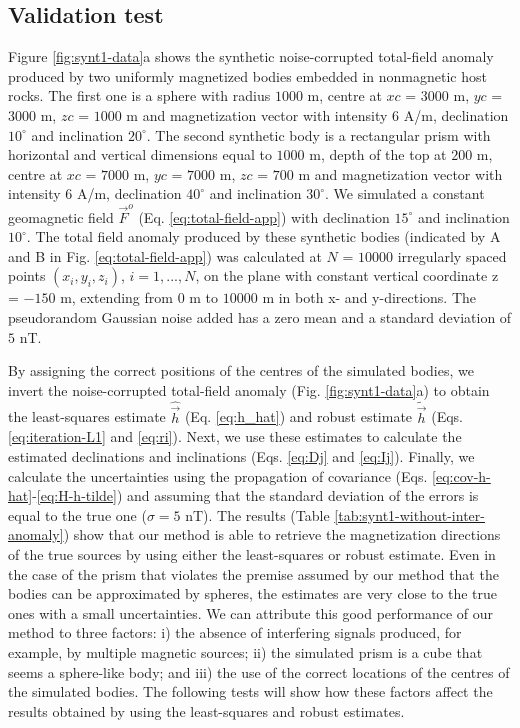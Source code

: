 \documentclass[journal abbreviation, npg]{copernicus}
\begin{document}
\subsection{Validation test}

Figure \ref{fig:synt1-data}a shows the synthetic noise-corrupted total-field anomaly produced by two uniformly magnetized bodies embedded in nonmagnetic host rocks. The first one is a sphere with radius $1000$ m, centre at $xc$ = $3000$ m, $yc$ = $3000$ m, $zc$ = $1000$ m and magnetization vector with intensity $6$ A/m, declination $10^{\circ}$ and inclination $20^{\circ}$. The second synthetic body is a rectangular prism with horizontal and vertical dimensions equal to $1000$ m, depth of the top at $200$ m, centre at $xc$ = $7000$ m, $yc$ = $7000$ m, $zc$ = $700$ m and magnetization vector with intensity $6$ A/m, declination $40^{\circ}$ and inclination $30^{\circ}$. We simulated a constant geomagnetic field $\vec{F}^{o}$ (Eq. \ref{eq:total-field-app}) with declination $15^{\circ}$ and inclination $10^{\circ}$. The total field anomaly produced by these synthetic bodies (indicated by A and B in Fig. \ref{eq:total-field-app}) was calculated at $N$ = $10000$ irregularly spaced points $(x_{i}, y_{i}, z_{i})$, $i = 1, ..., N$, on the plane with constant vertical coordinate z = $-150$ m, extending from $0$ m to $10000$ m in both x- and y-directions. The pseudorandom Gaussian noise added has a zero mean and a standard deviation of $5$ nT. 

By assigning the correct positions of the centres of the simulated bodies, we invert the noise-corrupted total-field anomaly (Fig. \ref{fig:synt1-data}a) to obtain the least-squares estimate $\hat{\vec{h}}$ (Eq. \ref{eq:h_hat}) and robust estimate $\tilde{\vec{h}}$ (Eqs. \ref{eq:iteration-L1} and \ref{eq:ri}). Next, we use these estimates to calculate the estimated declinations and inclinations (Eqs. \ref{eq:Dj} and \ref{eq:Ij}). Finally, we calculate the uncertainties using the propagation of covariance (Eqs. \ref{eq:cov-h-hat}-\ref{eq:H-h-tilde}) and assuming that the standard deviation of the errors is equal to the true one ($\sigma = 5$ nT). The results (Table \ref{tab:synt1-without-inter-anomaly}) show that our method is able to retrieve the magnetization directions of the true sources by using either the least-squares or robust estimate. Even in the case of the prism that violates the premise assumed by our method that the bodies can be approximated by spheres,  the estimates are very close to the true ones with a small uncertainties. We can attribute this good performance of our method to three factors: i) the absence of interfering signals produced, for example, by multiple magnetic sources; ii) the simulated prism is a cube that seems a sphere-like body; and iii) the use of the  correct locations of the centres of the simulated bodies. The following tests will show how these factors affect the results obtained by using the least-squares and robust estimates.
\end{document}
